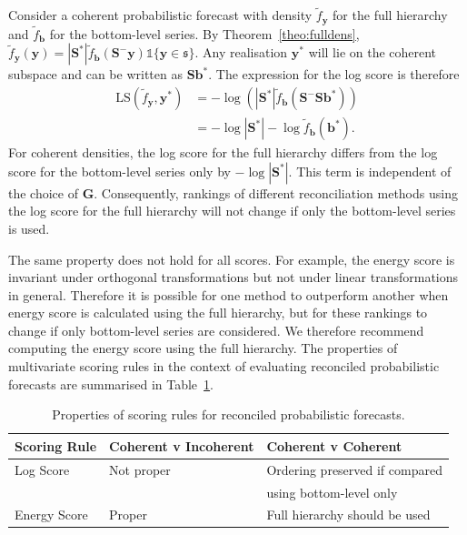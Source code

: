 \documentclass[11pt]{article}
\theoremstyle{definition}
\begin{document}
Consider a coherent probabilistic forecast with density $\tilde{f}_{\bm{y}}$ for the full hierarchy and $\tilde{f}_{\bm{b}}$ for the bottom-level series. By Theorem~\ref{theo:fulldens}, $\tilde{f}_{\bm{y}}(\bm{y})=|\bm{S}^*|\tilde{f}_{\bm{b}}(\bm{S}^-\bm{y})\mathbb{1}\{\bm{y}\in\mathfrak{s}\}$. Any realisation $\bm{y}^*$ will lie on the coherent subspace and can be written as $\bm{S}\bm{b}^*$. The expression for the log score is therefore
\begin{align}
\text{LS}(\tilde{f}_{\bm{y}},\bm{y}^*)&=-\log\left(|\bm{S}^*|\tilde{f}_{\bm{b}}(\bm{S}^-\bm{S}\bm{b}^*)\right)\nonumber\\
&=-\log|\bm{S}^*|-\log \tilde{f}_{\bm{b}}(\bm{b}^*).\nonumber
\end{align}
For coherent densities, the log score for the full hierarchy differs from the log score for the bottom-level series only by $-\log|\bm{S}^*|$. This term is independent of the choice of $\bm{G}$. Consequently, rankings of different reconciliation methods using the log score for the full hierarchy will not change if only the bottom-level series is used.

The same property does not hold for all scores. For example, the energy score is invariant under orthogonal transformations \citep{Szekely2013} but not under linear transformations in general. Therefore it is possible for one method to outperform another when energy score is calculated using the full hierarchy, but for these rankings to change if only bottom-level series are considered. We therefore recommend computing the energy score using the full hierarchy. The properties of multivariate scoring rules in the context of evaluating reconciled probabilistic forecasts are summarised in Table~\ref{tab:prop}.

\begin{table}
	\caption{Properties of scoring rules for reconciled probabilistic forecasts.}\label{tab:ScoringRulesProperties}
	\centering
	\begin{tabular}{lll}\hline
		Scoring Rule& Coherent v Incoherent &Coherent v Coherent\\
		\hline
		Log Score & Not proper & Ordering preserved if compared \\ && using bottom-level only\\
		Energy Score & Proper & Full hierarchy should be used\\
		\hline
	\end{tabular}

	\label{tab:prop}
\end{table}
\end{document}
